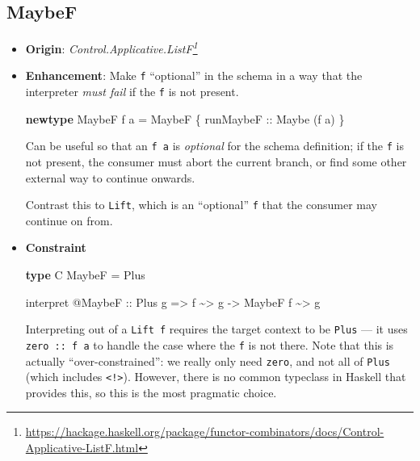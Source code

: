 \documentclass[]{article}
\newenvironment{Shaded}{}{}
\newcommand{\DataTypeTok}[1]{\textcolor[rgb]{0.56,0.13,0.00}{#1}}
\newcommand{\KeywordTok}[1]{\textcolor[rgb]{0.00,0.44,0.13}{\textbf{#1}}}
\newcommand{\NormalTok}[1]{#1}
\newcommand{\OperatorTok}[1]{\textcolor[rgb]{0.40,0.40,0.40}{#1}}
\newcommand{\OtherTok}[1]{\textcolor[rgb]{0.00,0.44,0.13}{#1}}
\renewcommand{\href}[2]{#2\footnote{\url{#1}}}
\begin{document}
\hypertarget{maybef}{%
\subsection{MaybeF}\label{maybef}}

\begin{itemize}
\item
  \textbf{Origin}:
  \emph{\href{https://hackage.haskell.org/package/functor-combinators/docs/Control-Applicative-ListF.html}{Control.Applicative.ListF}}
\item
  \textbf{Enhancement}: Make \texttt{f} ``optional'' in the schema in a way that
  the interpreter \emph{must fail} if the \texttt{f} is not present.

\begin{Shaded}
\begin{Highlighting}[]
\KeywordTok{newtype} \DataTypeTok{MaybeF}\NormalTok{ f a }\OtherTok{=} \DataTypeTok{MaybeF}\NormalTok{ \{}\OtherTok{ runMaybeF ::} \DataTypeTok{Maybe}\NormalTok{ (f a) \}}
\end{Highlighting}
\end{Shaded}

  Can be useful so that an \texttt{f\ a} is \emph{optional} for the schema
  definition; if the \texttt{f} is not present, the consumer must abort the
  current branch, or find some other external way to continue onwards.

  Contrast this to \texttt{Lift}, which is an ``optional'' \texttt{f} that the
  consumer may continue on from.
\item
  \textbf{Constraint}

\begin{Shaded}
\begin{Highlighting}[]
\KeywordTok{type} \DataTypeTok{C} \DataTypeTok{MaybeF} \OtherTok{=} \DataTypeTok{Plus}

\NormalTok{interpret }\OperatorTok{@}\DataTypeTok{MaybeF}
\OtherTok{    ::} \DataTypeTok{Plus}\NormalTok{ g}
    \OtherTok{=>}\NormalTok{ f }\OperatorTok{\textasciitilde{}>}\NormalTok{ g}
    \OtherTok{{-}>} \DataTypeTok{MaybeF}\NormalTok{ f }\OperatorTok{\textasciitilde{}>}\NormalTok{ g}
\end{Highlighting}
\end{Shaded}

  Interpreting out of a \texttt{Lift\ f} requires the target context to be
  \texttt{Plus} --- it uses \texttt{zero\ ::\ f\ a} to handle the case where the
  \texttt{f} is not there. Note that this is actually ``over-constrained'': we
  really only need \texttt{zero}, and not all of \texttt{Plus} (which includes
  \texttt{\textless{}!\textgreater{}}). However, there is no common typeclass in
  Haskell that provides this, so this is the most pragmatic choice.
\end{itemize}
\end{document}

